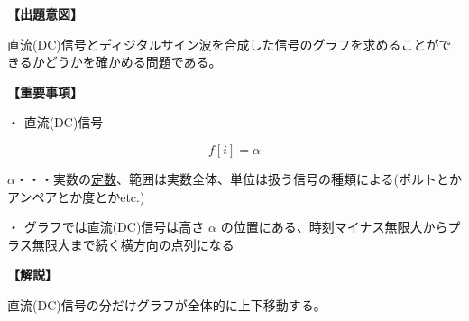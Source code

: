 \noindent \textbf{【出題意図】}

\noindent 直流(DC)信号とディジタルサイン波を合成した信号のグラフを求めることができるかどうかを確かめる問題である。

\vspace{1em}
\noindent \textbf{【重要事項】}

\medskip
\noindent・ 直流(DC)信号

\[
f[i] = \alpha
\]

\bigskip
\noindent $\alpha$・・・実数の\underline{定数}、範囲は実数全体、単位は扱う信号の種類による(ボルトとかアンペアとか度とかetc.)

\bigskip
\noindent・ グラフでは直流(DC)信号は高さ $\alpha$ の位置にある、時刻マイナス無限大からプラス無限大まで続く横方向の点列になる

\vspace{1em}
\noindent \textbf{【解説】}

\noindent 直流(DC)信号の分だけグラフが全体的に上下移動する。
